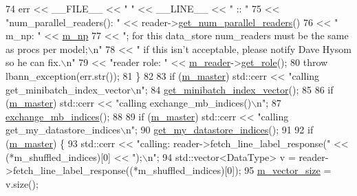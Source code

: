 \begin{DoxyCode}
74       err << \_\_FILE\_\_ << \textcolor{stringliteral}{" "} << \_\_LINE\_\_ << \textcolor{stringliteral}{" :: "}
75           << \textcolor{stringliteral}{"num\_parallel\_readers(): "} << reader->\hyperlink{classlbann_1_1generic__data__reader_ad15887cc31657d03925835aab0d4b675}{get\_num\_parallel\_readers}() 
76           << \textcolor{stringliteral}{" m\_np: "} << \hyperlink{classlbann_1_1generic__data__store_afcd4f99959c265c8c03dcf8ad3779d85}{m\_np} 
77           << \textcolor{stringliteral}{"; for this data\_store num\_readers must be the same as procs per model;\(\backslash\)n"}
78           << \textcolor{stringliteral}{" if this isn't acceptable, please notify Dave Hysom so he can fix.\(\backslash\)n"}
79           << \textcolor{stringliteral}{"reader role: "} << \hyperlink{classlbann_1_1generic__data__store_afa49ced0ab64c632371ea52532a91ec2}{m\_reader}->\hyperlink{classlbann_1_1generic__data__reader_a92982e1b399f37e2ead5aa440883cba5}{get\_role}();
80       \textcolor{keywordflow}{throw} lbann\_exception(err.str());
81     \}
82 
83     \textcolor{keywordflow}{if} (\hyperlink{classlbann_1_1generic__data__store_a143fd33ef3a53180bc62745e369c16f8}{m\_master}) std::cerr << \textcolor{stringliteral}{"calling get\_minibatch\_index\_vector\(\backslash\)n"};
84     \hyperlink{classlbann_1_1generic__data__store_ab861db5f81e45a6063b8922a331dd007}{get\_minibatch\_index\_vector}();
85 
86     \textcolor{keywordflow}{if} (\hyperlink{classlbann_1_1generic__data__store_a143fd33ef3a53180bc62745e369c16f8}{m\_master}) std::cerr << \textcolor{stringliteral}{"calling exchange\_mb\_indices()\(\backslash\)n"};
87     \hyperlink{classlbann_1_1generic__data__store_aa0ef8d7528f6775d47641ffe5ac229da}{exchange\_mb\_indices}();
88 
89     \textcolor{keywordflow}{if} (\hyperlink{classlbann_1_1generic__data__store_a143fd33ef3a53180bc62745e369c16f8}{m\_master}) std::cerr << \textcolor{stringliteral}{"calling get\_my\_datastore\_indices\(\backslash\)n"};
90     \hyperlink{classlbann_1_1generic__data__store_a3558f87939755b08ae151623a5799127}{get\_my\_datastore\_indices}();
91     
92     \textcolor{keywordflow}{if} (\hyperlink{classlbann_1_1generic__data__store_a143fd33ef3a53180bc62745e369c16f8}{m\_master}) \{
93       std::cerr << \textcolor{stringliteral}{"calling: reader->fetch\_line\_label\_response("} << (*m\_shuffled\_indices)[0] << \textcolor{stringliteral}{");\(\backslash\)n"};
94       std::vector<DataType> v = reader->fetch\_line\_label\_response((*m\_shuffled\_indices)[0]);
95       \hyperlink{classlbann_1_1data__store__csv_acf75e96923877e10c8ed499ec48f9320}{m\_vector\_size} = v.size();

\end{DoxyCode}
